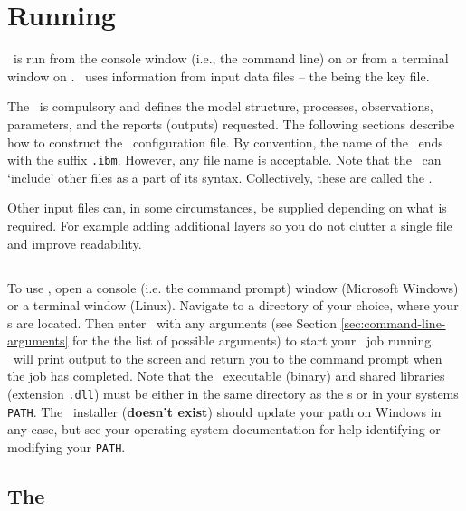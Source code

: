 \section{Running \IBM\label{sec:running}}

\IBM\ is run from the console window (i.e., the command line) on  or from a terminal window on . \IBM\ uses information from input data files -- the \emph{\config{}} being the key file. 

The \config\ is compulsory and defines the model structure, processes, observations, parameters, and the reports (outputs) requested. The following sections  describe how to construct the \IBM\ configuration file. By convention, the name of the \config\ ends with the suffix \texttt{.ibm}. However, any file name is acceptable. Note that the \config\ can `include' other files as a part of its syntax. Collectively, these are called the \config.

Other input files can, in some circumstances, be supplied depending on what is required. For example adding additional layers so you do not clutter a single file and improve readability.

\subsection{}

To use \IBM, open a console (i.e. the command prompt) window (Microsoft Windows) or a terminal window (Linux). Navigate to a directory of your choice, where your \config s are located. Then enter \ibm\ with any arguments (see Section \ref{sec:command-line-arguments} for the the list of possible arguments) to start your \IBM\ job running. \IBM\ will print output to the screen and return you to the command prompt when the job has completed. Note that the \IBM\ executable (binary) and shared libraries (extension \texttt{.dll}) must be either in the same directory as the \config s or in your systems \texttt{PATH}. The \IBM\ installer (\textbf{doesn't exist}) should update your path on Windows in any case, but see your operating system documentation for help identifying or modifying your \texttt{PATH}.


\subsection{The \config\label{sec:config-files}}

